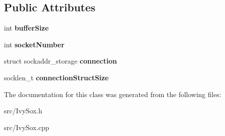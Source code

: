 \subsection*{Public Attributes}
\begin{DoxyCompactItemize}
\item 
\hypertarget{class_inbound_connection_a0252a8d8e67ee23cc918a5143a883eac}{}int {\bfseries buffer\+Size}\label{class_inbound_connection_a0252a8d8e67ee23cc918a5143a883eac}

\item 
\hypertarget{class_inbound_connection_abe59e235e714eeeb21e34496b047f90a}{}int {\bfseries socket\+Number}\label{class_inbound_connection_abe59e235e714eeeb21e34496b047f90a}

\item 
\hypertarget{class_inbound_connection_ad2f2ebe0e15b095319aa058377c92f8d}{}struct sockaddr\+\_\+storage {\bfseries connection}\label{class_inbound_connection_ad2f2ebe0e15b095319aa058377c92f8d}

\item 
\hypertarget{class_inbound_connection_a5bc8f0afff5e25441659b341ca231a32}{}socklen\+\_\+t {\bfseries connection\+Struct\+Size}\label{class_inbound_connection_a5bc8f0afff5e25441659b341ca231a32}

\end{DoxyCompactItemize}


The documentation for this class was generated from the following files\+:\begin{DoxyCompactItemize}
\item 
src/Ivy\+Sox.\+h\item 
src/Ivy\+Sox.\+cpp\end{DoxyCompactItemize}
